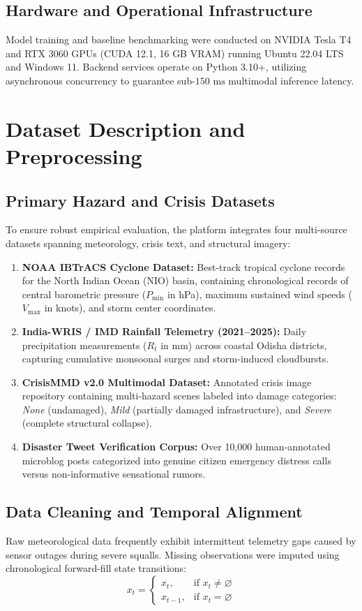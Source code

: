 \documentclass{article}
\begin{document}
\subsection{Hardware and Operational Infrastructure}
Model training and baseline benchmarking were conducted on NVIDIA Tesla T4 and RTX 3060 GPUs (CUDA 12.1, 16 GB VRAM) running Ubuntu 22.04 LTS and Windows 11. Backend services operate on Python 3.10+, utilizing asynchronous concurrency to guarantee sub-$150\text{ ms}$ multimodal inference latency.

\section{Dataset Description and Preprocessing}
\subsection{Primary Hazard and Crisis Datasets}
To ensure robust empirical evaluation, the platform integrates four multi-source datasets spanning meteorology, crisis text, and structural imagery:
\begin{enumerate}[label=\textbf{\Roman*.}]
    \item \textbf{NOAA IBTrACS Cyclone Dataset:} Best-track tropical cyclone records for the North Indian Ocean (NIO) basin, containing chronological records of central barometric pressure ($P_{\text{min}}$ in hPa), maximum sustained wind speeds ($V_{\text{max}}$ in knots), and storm center coordinates.
    \item \textbf{India-WRIS / IMD Rainfall Telemetry (2021--2025):} Daily precipitation measurements ($R_t$ in mm) across coastal Odisha districts, capturing cumulative monsoonal surges and storm-induced cloudbursts.
    \item \textbf{CrisisMMD v2.0 Multimodal Dataset:} Annotated crisis image repository containing multi-hazard scenes labeled into damage categories: \textit{None} (undamaged), \textit{Mild} (partially damaged infrastructure), and \textit{Severe} (complete structural collapse).
    \item \textbf{Disaster Tweet Verification Corpus:} Over 10,000 human-annotated microblog posts categorized into genuine citizen emergency distress calls versus non-informative sensational rumors.
\end{enumerate}

\subsection{Data Cleaning and Temporal Alignment}
Raw meteorological data frequently exhibit intermittent telemetry gaps caused by sensor outages during severe squalls. Missing observations were imputed using chronological forward-fill state transitions:
\begin{equation}
x_t = \begin{cases}
x_t, & \text{if } x_t \neq \varnothing \\
x_{t-1}, & \text{if } x_t = \varnothing
\end{cases}
\end{equation}
\end{document}

